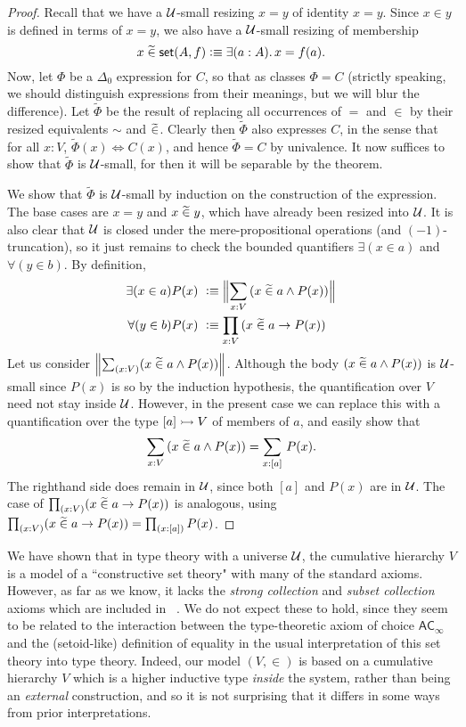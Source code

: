 \begin{proof}
Recall that we have a $\mathcal{U}$-small resizing $x = y$ of identity $x = y$. Since $x\in y$ is defined in terms of $x=y$, we also have a $\mathcal{U}$-small resizing of membership
%
\begin{equation*}
  x\bin\vset(A,f) \defeq \exis{a:A} x = f(a).
\end{equation*}
%
Now, let $\Phi$ be a $\Delta_0$ expression for $C$, so that as classes $\Phi = C$ (strictly speaking, we should distinguish expressions from their meanings, but we will blur the difference). Let $\widetilde{\Phi}$ be the result of replacing all occurrences of $=$ and $\in$ by their resized equivalents $\sim$ and $\mathrel{\widetilde{\in}}$.  Clearly then $\widetilde{\Phi}$ also expresses $C$, in the sense that for all $x:V$, $\widetilde{\Phi}(x) \Leftrightarrow C(x)$, and hence $\widetilde{\Phi}=C$ by univalence.  It now suffices to show that $\widetilde{\Phi}$ is $\mathcal{U}$-small, for then it will be separable by the theorem.  

We show that  $\widetilde{\Phi}$ is $\mathcal{U}$-small by induction on the construction of the expression.  The base cases are $x = y$ and $x\mathrel{\widetilde{\in}} y$, which have already been resized into $\mathcal{U}$.  It is also clear that $\mathcal{U}$ is closed under the mere-propositional operations (and $(-1)$-truncation), so it just remains to check the bounded quantifiers $\exists(x\in a)$ and $\forall(y\in b)$.  By definition,  
\begin{align*}
\exists(x\in a) P(x)\ &\defeq \Brck {\sm{x:V}(x\bin a \land P(x))}\\
\forall(y\in b) P(x)\ &\defeq  \prd{x:V}(x\bin a \to P(x))
\end{align*} 
Let us consider $\brck {\sm{x:V}(x\bin a \land P(x))}$.  Although the body $(x\mathrel{\widetilde{\in}} a \land P(x))$ is $\mathcal{U}$-small since $P(x)$ is so by the induction hypothesis, the quantification over $V$ need not stay inside $\mathcal{U}$.  However, in the present case we can replace this with a quantification over the type $[a]\rightarrowtail V$ of members of $a$, and easily show that
\begin{equation*}
  \sm{x:V}(x\bin a \land P(x)) = \sm{x:[a]} P(x).
\end{equation*}
The righthand side does remain in $\mathcal{U}$, since both $[a]$ and $P(x)$ are in $\mathcal{U}$.  The case of $\prd{x:V}(x\bin a \to P(x))$ is analogous, using $\prd{x:V}(x\bin a \to P(x)) = \prd{x:[a]}P(x)$.
\end{proof}

We have shown that in type theory with a universe $\mathcal{U}$, the cumulative hierarchy $V$ is a model of a ``constructive set theory" with many of the standard axioms.
However, as far as we know, it lacks the \emph{strong collection} and \emph{subset collection} axioms which are included in \CZF{}~\cite{AczelCZF}.
We do not expect these to hold, since they seem to be related to the interaction between the type-theoretic axiom of choice $\mathsf{AC}_\infty$ and the (setoid-like) definition of equality in the usual interpretation of this set theory into type theory.
Indeed, our model $(V,\in)$ is based on a cumulative hierarchy $V$ which is a higher inductive type \emph{inside} the system, rather than being an \emph{external} construction, and so it is not surprising that it differs in some ways from prior interpretations.

